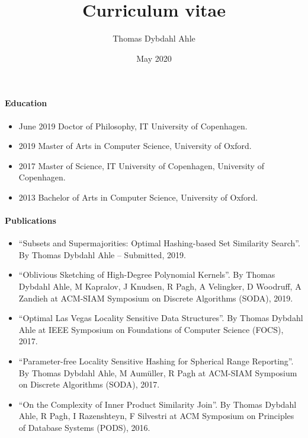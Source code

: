 \documentclass[11pt]{article}
\title{Curriculum vitae}
\author{Thomas Dybdahl Ahle}
\date{May 2020}
\begin{document}
\maketitle


\paragraph{Education}
\begin{itemize}
   \item[]
      June 2019
      Doctor of Philosophy,
      IT University of Copenhagen.
   \item[]
      2019
      Master of Arts in Computer Science,
      University of Oxford.
   \item[]
      2017
      Master of Science,
      IT University of Copenhagen, University of Copenhagen.
   \item[]
      2013
      Bachelor of Arts in Computer Science,
      University of Oxford.
\end{itemize}

\paragraph{Publications}
\begin{itemize}
   \item[]
   ``Subsets and Supermajorities: Optimal Hashing-based Set Similarity Search''.
   By
         Thomas Dybdahl Ahle       -- Submitted,
    2019.
   \item[]
   ``Oblivious Sketching of High-Degree Polynomial Kernels''.
   By
         Thomas Dybdahl Ahle,       M Kapralov,       J Knudsen,       R Pagh,       A Velingker,       D Woodruff,       A Zandieh       at
       ACM-SIAM Symposium on Discrete Algorithms (SODA),
    2019.
   \item[]
   ``Optimal Las Vegas Locality Sensitive Data Structures''.
   By
         Thomas Dybdahl Ahle       at
       IEEE Symposium on Foundations of Computer Science (FOCS),
    2017.
   \item[]
   ``Parameter-free Locality Sensitive Hashing for Spherical Range Reporting''.
   By
         Thomas Dybdahl Ahle,       M Aumüller,       R Pagh       at
       ACM-SIAM Symposium on Discrete Algorithms (SODA),
    2017.
   \item[]
   ``On the Complexity of Inner Product Similarity Join''.
   By
         Thomas Dybdahl Ahle,       R Pagh,       I Razenshteyn,       F Silvestri       at
       ACM Symposium on Principles of Database Systems (PODS),
    2016.
\end{itemize}
\end{document}
